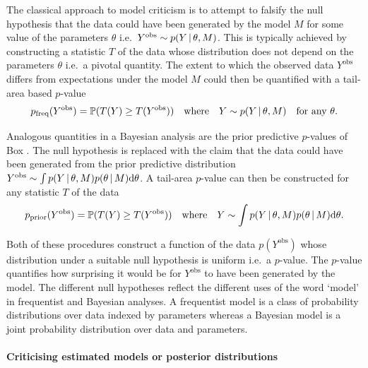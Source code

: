\documentclass{article} %
\def\ie{i.e.\ }
\begin{document}
The classical approach to model criticism is to attempt to falsify the null hypothesis that the data could have been generated by the model $M$ for some value of the parameters $\theta$ \ie ${Y^\textrm{obs} \sim p(Y \,|\, \theta, M)}$.
This is typically achieved by constructing a statistic $T$ of the data whose distribution does not depend on the parameters $\theta$ \ie a pivotal quantity.
The extent to which the observed data $Y^\textrm{obs}$ differs from expectations under the model $M$ could then be quantified with a tail-area based $p$-value
\vspace{-0.3\baselineskip}
\begin{equation}
  p_\textrm{freq}(Y^\textrm{obs}) = \mathbb{P}(T(Y)\geq T(Y^\textrm{obs})) \quad \textrm{where} \quad Y \sim p(Y \,|\, \theta, M) \quad \textrm{for any } \theta.
  \label{eq:freq-p-value}
\end{equation}

\vspace{-0.5\baselineskip}

Analogous quantities in a Bayesian analysis are the prior predictive $p$-values of Box \citep{Box1980-ud}.
The null hypothesis is replaced with the claim that the data could have been generated from the prior predictive distribution ${Y^\textrm{obs} \sim \int p(Y \,|\, \theta, M)p(\theta \,|\, M) \mathrm{d}\theta}$.
A tail-area $p$-value can then be constructed for any statistic $T$ of the data
\vspace{-0.8\baselineskip}
\begin{equation}
  p_\textrm{prior}(Y^\textrm{obs}) = \mathbb{P}(T(Y)\geq T(Y^\textrm{obs})) \quad \textrm{where} \quad Y \sim \int p(Y \,|\, \theta, M)p(\theta \,|\, M) \mathrm{d}\theta.
  \label{eq:prior-p-value}
\end{equation}

\vspace{-\baselineskip}

Both of these procedures construct a function of the data $p(Y^\textrm{obs})$ whose distribution under a suitable null hypothesis is uniform \ie a $p$-value.
The $p$-value quantifies how surprising it would be for $Y^\textrm{obs}$ to have been generated by the model.
The different null hypotheses reflect the different uses of the word `model' in frequentist and Bayesian analyses.
A frequentist model is a class of probability distributions over data indexed by parameters whereas a Bayesian model is a joint probability distribution over data and parameters.

\paragraph{Criticising estimated models or posterior distributions}
\end{document}
